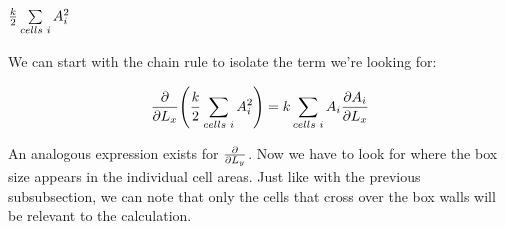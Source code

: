\documentclass[12pt]{article}
\begin{document}
\subsubsection{$\frac{k}{2} \sum\limits_{cells\hspace{1mm}i} A_i^2$}
We can start with the chain rule to isolate the term we're looking for:
\begin{center}
\begin{equation}
\pdv{L_x} (\frac{k}{2} \sum\limits_{cells\hspace{1mm}i} A_i^2) =  k \sum\limits_{cells\hspace{1mm}i} A_i \pdv{A_i}{L_x}
\end{equation}
\end{center}
An analogous expression exists for $\pdv{L_y}$. Now we have to look for where the box size appears in the individual cell areas. Just like with the previous subsubsection, we can note that only the cells that cross over the box walls will be relevant to the calculation.
\end{document}
